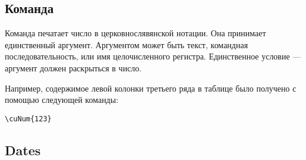 \begin{RU}
\subsection{Команда }
Команда печатает число в церковнослявянской нотации.
Она принимает единственный аргумент. Аргументом может быть текст, командная последовательность, или имя 
целочисленного регистра. Единственное условие --- аргумент должен раскрыться в число.

Например, содержимое левой колонки третьего ряда в таблице было получено с помощью
следующей команды:
\begin{verbatim}
\cuNum{123}
\end{verbatim}
\end{RU}

\begin{EN}
\section{Dates}
\subsection{}
\subsection{}
\subsection{}
\subsection{}
\subsection{}
\subsection{}
\subsection{}
\end{EN}

